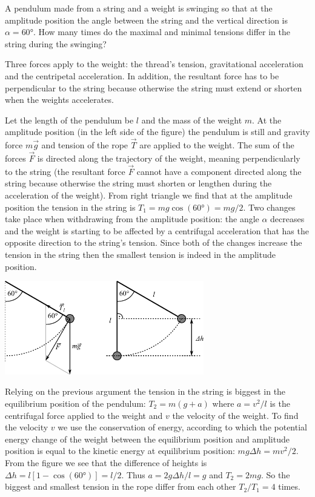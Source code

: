A pendulum made from a string and a weight is swinging so that at the amplitude position the angle between the string and the vertical direction is $\alpha=\ang{60}$. How many times do the maximal and minimal tensions differ in the string during the swinging?

\hinteng
Three forces apply to the weight: the thread’s tension, gravitational acceleration and the centripetal acceleration. In addition, the resultant force has to be perpendicular to the string because otherwise the string must extend or shorten when the weights accelerates.

\solueng
Let the length of the pendulum be $l$ and the mass of the weight $m$. At the amplitude position (in the left side of the figure) the pendulum is still and gravity force $m\vec{g}$ and tension of the rope $\vec{T}$ are applied to the weight. The sum of the forces $\vec{F}$ is directed along the trajectory of the weight, meaning perpendicularly to the string (the resultant force $\vec{F}$ cannot have a component directed along the string because otherwise the string must shorten or lengthen during the acceleration of the weight). From right triangle we find that at the amplitude position the tension in the string is $T_1 = mg\cos(\ang{60}) = mg / 2$. Two changes take place when withdrawing from the amplitude position: the angle $\alpha$ decreases and the weight is starting to be affected by a centrifugal acceleration that has the opposite direction to the string’s tension. Since both of the changes increase the tension in the string then the smallest tension is indeed in the amplitude position.
\begin{center}
	\vspace{-10pt}
	\includegraphics[width=0.65\textwidth]{2017-v2g-03-pendel-joonis}
	\vspace{-15pt}
\end{center}
Relying on the previous argument the tension in the string is biggest in the equilibrium position of the pendulum: $T_2 = m(g + a)$ where $a = v^2 / l$ is the centrifugal force applied to the weight and $v$ the velocity of the weight. To find the velocity $v$ we use the conservation of energy, according to which the potential energy change of the weight between the equilibrium position and amplitude position is equal to the kinetic energy at equilibrium position: $mg\Delta h = mv^2 / 2$. From the figure we see that the difference of heights is $\Delta h = l[1-\cos(\ang{60})] = l / 2$. Thus $a = 2g\Delta h / l = g$ and $T_2 = 2mg$. So the biggest and smallest tension in the rope differ from each other $T_2 / T_1 = 4$ times.
\probend